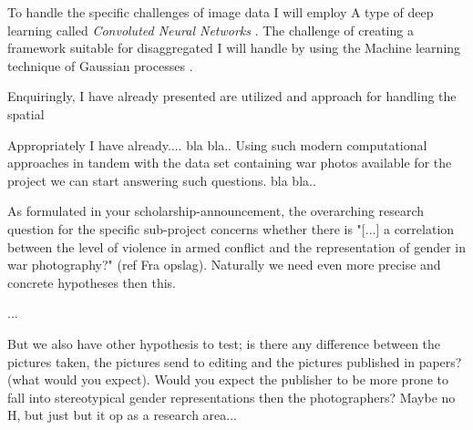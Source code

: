 \documentclass[a4paper]{article}
\begin{document}
To handle the specific challenges of image data I will employ A type of deep learning called \emph{Convoluted Neural Networks} \cite[XXXX]{francois2017deep}. The challenge of creating a framework suitable for disaggregated I will handle by using the Machine learning technique of Gaussian processes \cite{williams2006gaussian}.\par 








Enquiringly, I have already presented are utilized and approach for handling the spatial 


Appropriately I have already.... bla bla.. Using such modern computational approaches in tandem with the data set containing war photos available for the project we can start answering such questions. bla bla.. \par

As formulated in your scholarship-announcement, the overarching research question for the specific sub-project concerns whether there is "[...] a correlation between the level of violence in armed conflict and the representation of gender in war photography?" (ref Fra opslag). Naturally we need even more precise and concrete hypotheses then this.\par %


... \par

But we also have other hypothesis to test; is there any difference between the pictures taken, the pictures send to editing and the pictures published in papers? (what would you expect). Would you expect the publisher to be more prone to fall into stereotypical gender representations then the photographers? Maybe no H, but just but it op as a research area...
\end{document}
